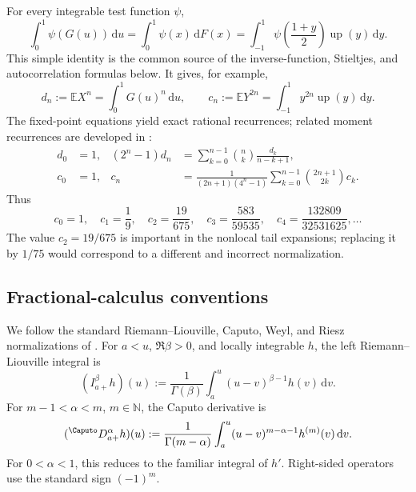 \documentclass[11pt,oneside]{article}
\theoremstyle{definition}
\theoremstyle{remark}
\newcommand{\Up}{\operatorname{up}}
\newcommand{\E}{\mathbb E}
\newcommand{\N}{\mathbb N}
\newcommand{\dd}{\,\mathrm d}
\newcommand{\1}{\mathbf 1}
\begin{document}
For every integrable test function $\psi$,
\begin{equation}
 \int_0^1\psi(G(u))\dd u
 =\int_0^1\psi(x)\dd F(x)
 =\int_{-1}^{1}\psi\!\left(\frac{1+y}{2}\right)\Up(y)\dd y.
 \label{p11:eq:three-way-dictionary}
\end{equation}
This simple identity is the common source of the inverse-function,
Stieltjes, and autocorrelation formulas below.  It gives, for example,
\begin{equation}
 d_n:=\E X^n=\int_0^1G(u)^n\dd u,
 \qquad
 c_n:=\E Y^{2n}=\int_{-1}^{1}y^{2n}\Up(y)\dd y.
\end{equation}
The fixed-point equations yield exact rational recurrences; related moment
recurrences are developed in \cite{p11:arias1982,p11:Have}:
\begin{align}
 d_0&=1,
 &
 (2^n-1)d_n
 &=\sum_{k=0}^{n-1}\binom nk\frac{d_k}{n-k+1},
 \label{p11:eq:d-moment-recurrence}\\
 c_0&=1,
 &
 c_n
 &=\frac{1}{(2n+1)(4^n-1)}
   \sum_{k=0}^{n-1}\binom{2n+1}{2k}c_k.
 \label{p11:eq:c-moment-recurrence}
\end{align}
Thus
\begin{equation}
 c_0=1,
 \quad c_1=\frac19,
 \quad c_2=\frac{19}{675},
 \quad c_3=\frac{583}{59535},
 \quad c_4=\frac{132809}{32531625},\ldots
 \label{p11:eq:first-c-moments}
\end{equation}
The value $c_2=19/675$ is important in the nonlocal tail expansions; replacing
it by $1/75$ would correspond to a different and incorrect normalization.

\subsection{Fractional-calculus conventions}

We follow the standard Riemann--Liouville, Caputo, Weyl, and Riesz
normalizations of \cite{p11:Caputo1967,p11:Samko,p11:Kilbas}.  For $a<u$,
$\Re\beta>0$, and locally integrable $h$, the left
Riemann--Liouville integral is
\begin{equation}
 (I_{a+}^{\beta}h)(u)
 :=\frac1{\Gamma(\beta)}
   \int_a^u(u-v)^{\beta-1}h(v)\dd v.
 \label{p11:eq:RL-def}
\end{equation}
For $m-1<\alpha<m$, $m\in\N$, the Caputo derivative is
\begin{equation}
 ({}^{\Caputo}D_{a+}^{\alpha}h)(u)
 :=\frac1{\Gamma(m-\alpha)}
   \int_a^u(u-v)^{m-\alpha-1}h^{(m)}(v)\dd v.
 \label{p11:eq:Caputo-def}
\end{equation}
For $0<\alpha<1$, this reduces to the familiar integral of $h'$.  Right-sided
operators use the standard sign $(-1)^m$.
\end{document}
